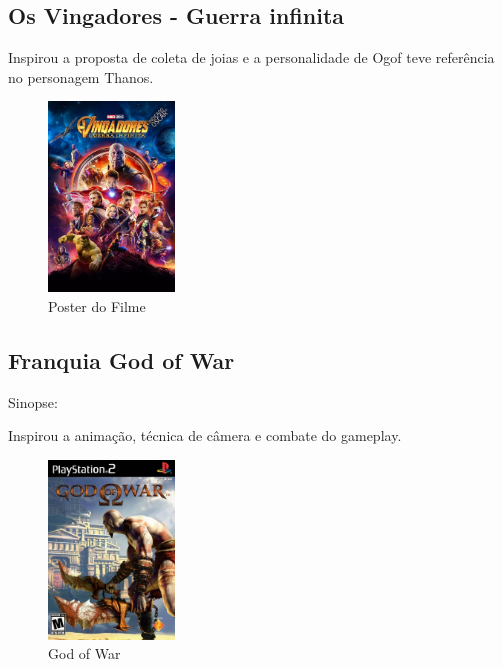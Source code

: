 \subsection{Os Vingadores - Guerra infinita}

Inspirou a proposta de coleta de joias e a personalidade de Ogof teve referência no personagem Thanos.

\begin{figure}[!htb]
	\caption{\label{vingadores}Poster do Filme}
	\begin{center}
	    \includegraphics[width=0.3\textwidth]{imagens/vingadores.jpeg}
	\end{center}
\end{figure}

\subsection{Franquia God of War}

Sinopse:

Inspirou a animação, técnica de câmera e combate do gameplay.


\begin{figure}[!htb]
	\caption{\label{god_of_war}God of War}
	\begin{center}
	    \includegraphics[width=0.3\textwidth]{imagens/GodofWar.jpg}
	\end{center}
\end{figure}

